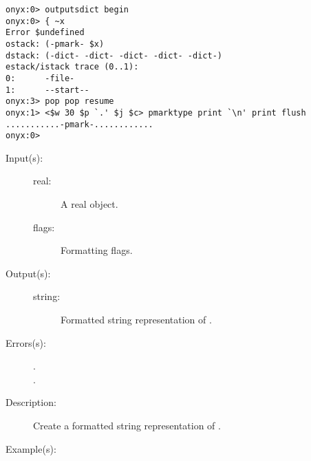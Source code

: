\begin{description}
\begin{description}
\begin{verbatim}
onyx:0> outputsdict begin
onyx:0> { ~x
Error $undefined
ostack: (-pmark- $x)
dstack: (-dict- -dict- -dict- -dict- -dict-)
estack/istack trace (0..1):
0:      -file-
1:      --start--
onyx:3> pop pop resume
onyx:1> <$w 30 $p `.' $j $c> pmarktype print `\n' print flush
...........-pmark-............
onyx:0>
		\end{verbatim}
	\end{description}
\label{outputsdict:realtype}
\item[{\onyxop{real flags}{realtype}{string}}: ]
	\begin{description}\item[]
	\item[Input(s): ]
		\begin{description}\item[]
		\item[real: ]
			A real object.
		\item[flags: ]
			Formatting flags.
		\end{description}
	\item[Output(s): ]
		\begin{description}\item[]
		\item[string: ]
			Formatted string representation of .
		\end{description}
	\item[Errors(s): ]
		\begin{description}\item[]
		\item[.]
		\item[.]
		\end{description}
	\item[Description: ]
		Create a formatted string representation of .
	\item[Example(s): ]\begin{verbatim}


\end{verbatim}
\end{description}
\end{description}
